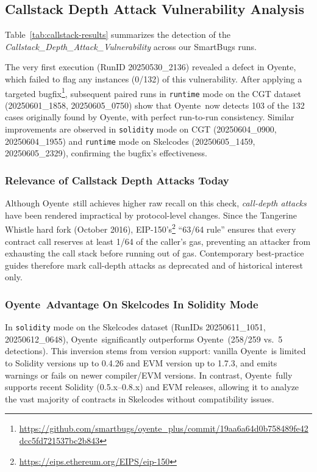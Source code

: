 \documentclass{article}
\newcommand\OY{Oyente}
\newcommand\OYp{\OY\raisebox{0.3ex}{\smaller +}}
\newcommand\CGTrbcA{20250530\_2136}%
\newcommand\CGTrbcB{20250601\_1858}%
\newcommand\CGTrbcC{20250605\_0750}%
\newcommand\CGTsscA{20250604\_0900}%
\newcommand\CGTsscB{20250604\_1955}%
\newcommand\SKCrbcA{20250605\_1459}%
\newcommand\SKCrbcB{20250605\_2329}%
\newcommand\SKCsscA{20250611\_1051}%
\newcommand\SKCsscB{20250612\_0648}%
\begin{document}
	\subsection{Callstack Depth Attack Vulnerability Analysis}
	Table~\ref{tab:callstack-results} summarizes the detection of the \emph{Callstack\_Depth\_Attack\_Vulnerability} across our SmartBugs runs.

	The very first execution (RunID \CGTrbcA) revealed a defect in \OYp, which failed to flag any instances (0/132) of this vulnerability. After applying a targeted bugfix\footnote{\url{https://github.com/smartbugs/oyente_plus/commit/19aa6a64d0b758489fe42dcc5fd721537bc2b843}}, subsequent paired runs in \texttt{runtime} mode on the CGT dataset (\CGTrbcB, \CGTrbcC) show that \OYp\ now detects 103 of the 132 cases originally found by \OY, with perfect run-to-run consistency. Similar improvements are observed in \texttt{solidity} mode on CGT (\CGTsscA, \CGTsscB) and \texttt{runtime} mode on Skelcodes (\SKCrbcA, \SKCrbcB), confirming the bugfix’s effectiveness.

	\subsubsection*{Relevance of Callstack Depth Attacks Today}
	Although \OY\ still achieves higher raw recall on this check, \emph{call-depth attacks} have been rendered impractical by protocol-level changes. Since the Tangerine Whistle hard fork (October 2016), EIP-150’s\footnote{\url{https://eips.ethereum.org/EIPS/eip-150}} “63/64 rule” ensures that every contract call reserves at least 1/64 of the caller’s gas, preventing an attacker from exhausting the call stack before running out of gas. Contemporary best-practice guides therefore mark call-depth attacks as deprecated and of historical interest only.

	\subsubsection*{\OYp\ Advantage On Skelcodes In Solidity Mode}
	In \texttt{solidity} mode on the Skelcodes dataset (RunIDs \SKCsscA, \SKCsscB), \OYp\ significantly outperforms \OY\ (258/259 vs.\ 5 detections). This inversion stems from version support: vanilla \OY\ is limited to Solidity versions up to 0.4.26 and EVM version up to 1.7.3, and emits warnings or fails on newer compiler/EVM versions. In contrast, \OYp\ fully supports recent Solidity (0.5.x–0.8.x) and EVM releases, allowing it to analyze the vast majority of contracts in Skelcodes without compatibility issues.
\end{document}

